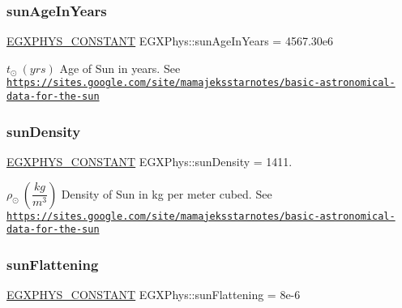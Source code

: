 \subsubsection{\texorpdfstring{sun\+Age\+In\+Years}{sunAgeInYears}}
{\footnotesize\ttfamily \mbox{\hyperlink{group___e_g_x_phys-_constants-_macros_ga76980d288494ce1714c9ac68a95ba702}{E\+G\+X\+P\+H\+Y\+S\+\_\+\+C\+O\+N\+S\+T\+A\+NT}} E\+G\+X\+Phys\+::sun\+Age\+In\+Years = 4567.\+30e6}

$t_{\odot} \ (yrs)$ Age of Sun in years. See \href{https://sites.google.com/site/mamajeksstarnotes/basic-astronomical-data-for-the-sun}{\tt https\+://sites.\+google.\+com/site/mamajeksstarnotes/basic-\/astronomical-\/data-\/for-\/the-\/sun} \mbox{\label{group___e_g_x_phys-_constants-_astrophysics-_solar_system-_sun-_bulk_gacee8979e95c926008206cc47c4cdc809}} 
\subsubsection{\texorpdfstring{sun\+Density}{sunDensity}}
{\footnotesize\ttfamily \mbox{\hyperlink{group___e_g_x_phys-_constants-_macros_ga76980d288494ce1714c9ac68a95ba702}{E\+G\+X\+P\+H\+Y\+S\+\_\+\+C\+O\+N\+S\+T\+A\+NT}} E\+G\+X\+Phys\+::sun\+Density = 1411.}

$\rho_{\odot} \ (\dfrac{kg}{m^3})$ Density of Sun in kg per meter cubed. See \href{https://sites.google.com/site/mamajeksstarnotes/basic-astronomical-data-for-the-sun}{\tt https\+://sites.\+google.\+com/site/mamajeksstarnotes/basic-\/astronomical-\/data-\/for-\/the-\/sun} \mbox{\label{group___e_g_x_phys-_constants-_astrophysics-_solar_system-_sun-_bulk_ga4487692a8eaf3f3eec0aae769eefcabb}} 
\subsubsection{\texorpdfstring{sun\+Flattening}{sunFlattening}}
{\footnotesize\ttfamily \mbox{\hyperlink{group___e_g_x_phys-_constants-_macros_ga76980d288494ce1714c9ac68a95ba702}{E\+G\+X\+P\+H\+Y\+S\+\_\+\+C\+O\+N\+S\+T\+A\+NT}} E\+G\+X\+Phys\+::sun\+Flattening = 8e-\/6}

